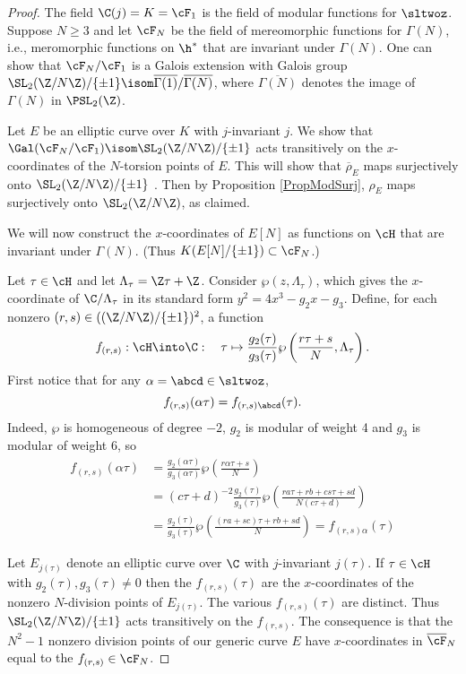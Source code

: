 \documentclass{report}
\begin{document}
\begin{proof}
  The field $\C(j)=K=\cF_1$ is the field of modular functions for
  $\sltwoz$. Suppose $N\geq 3$ and let $\cF_N$ be the field of
  mereomorphic functions for $\Gamma(N)$, i.e., meromorphic functions
  on $\h^*$ that are invariant under $\Gamma(N)$.  One can show that
  $\cF_N/\cF_1$ is a Galois extension with Galois group
  $\SL_2(\Z/N\Z)/\{\pm 1\} \isom
  \overline{\Gamma(1)}/\overline{\Gamma(N)}$, where
  $\overline{\Gamma(N)}$ denotes the image of $\Gamma(N)$ in
  $\PSL_2(\Z)$.

Let $E$ be an elliptic curve over $K$ with $j$-invariant $j$.
We show that $\Gal(\cF_N/\cF_1) \isom \SL_2(\Z/N\Z)/\{\pm 1\}$
acts transitively on the $x$-coordinates of the
$N$-torsion points of $E$. This will show that $\overline{\rho}_E$
maps surjectively onto $\SL_2(\Z/N\Z)/\{\pm 1\}$ . Then by
Proposition \ref{PropModSurj}, $\rho_E$ maps surjectively
onto $\SL_2(\Z/N\Z)$, as claimed.

We will now construct the $x$-coordinates of $E[N]$ as
functions on $\cH$ that are invariant under $\Gamma(N)$.
(Thus $K(E[N]/\{\pm 1\})\subset \cF_N$.)

Let $\tau\in\cH$ and let $\Lambda_{\tau}=\Z\tau+\Z$. Consider
$\wp(z,\Lambda_{\tau})$, which gives the $x$-coordinate of
$\C/\Lambda_{\tau}$ in its standard form
$y^2=4x^3-g_2x-g_3$. Define, for
each nonzero $(r,s)\in((\Z/N\Z)/\{\pm{}1\})^2$, a function
$$f_{(r,s)}:\cH\into\C: \quad \tau\mapsto\frac{g_2(\tau)}{g_3(\tau)}
          \wp\left(\frac{r\tau+s}{N},\Lambda_{\tau}\right).$$
First notice that for any $\alpha=\abcd\in\sltwoz$,
$$f_{(r,s)}(\alpha\tau)=f_{(r,s)\abcd}(\tau).$$
Indeed, $\wp$ is homogeneous of degree $-2$, $g_2$ is modular
of weight 4 and $g_3$ is modular of weight 6, so
\begin{align*}
f_{(r,s)}(\alpha\tau)& =\frac{g_2(\alpha\tau)}{g_3(\alpha\tau)}
                      \wp\left(\frac{r\alpha\tau+s}{N}\right)\\
& = (c\tau+d)^{-2}\frac{g_2(\tau)}{g_3(\tau)}
                      \wp\left(\frac{ra\tau+rb+cs\tau+sd}{N(c\tau+d)}\right)\\
& = \frac{g_2(\tau)}{g_3(\tau)}\wp\left(\frac{(ra+sc)\tau+rb+sd}{N}\right)
  = f_{(r,s)\alpha}(\tau)
\end{align*}

Let $E_{j(\tau)}$ denote an elliptic curve over
$\C$ with $j$-invariant $j(\tau)$.  If $\tau\in\cH$ with $g_2(\tau),
g_3(\tau)\neq 0$ then the $f_{(r,s)}(\tau)$ are the $x$-coordinates of
the nonzero $N$-division points of $E_{j(\tau)}$. The various
$f_{(r,s)}(\tau)$ are distinct. Thus $\SL_2(\Z/N\Z)/\{\pm 1\}$ acts
transitively on the $f_{(r,s)}$. The consequence is that the $N^2-1$
nonzero division points of our generic curve $E$ have $x$-coordinates
in $\overline{\cF}_N$ equal to the $f_{(r,s)}\in\cF_N$.
\end{proof}
\end{document}
